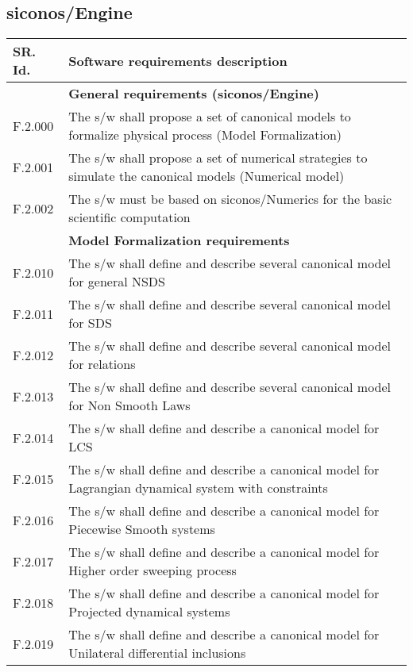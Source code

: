 

\subsection{\ac{siconos}/Engine}
\begin{longtable}{%
    |>{\columncolor[gray]{.8}}p{}%
    |>{\columncolor[gray]{.95}}p{}|}
  \hline
  \rowcolor[gray]{.8}   SR. Id. & Software requirements description \\
  \hline 
  \hline
  & \textbf{ General requirements (\ac{siconos}/Engine)}\\
  \hline
  F.2.000 & The s/w shall propose a set of  canonical models to formalize physical process  (Model Formalization) \\
  F.2.001 & The s/w shall propose a set of numerical strategies to simulate the  canonical models (Numerical model)\\
  F.2.002 & The s/w  must be based on \ac{siconos}/Numerics  for the basic  scientific computation \\
  \hline
  & \textbf{Model Formalization requirements }\\
  \hline
  F.2.010  &  The s/w shall  define and describe several canonical model for general NSDS \\
  F.2.011  &  The s/w shall  define and describe several canonical model for SDS\\
  F.2.012  &  The s/w shall  define and describe several canonical model for relations\\
  F.2.013  &  The s/w shall  define and describe several canonical model for Non Smooth Laws\\  
  F.2.014  &  The s/w shall  define and describe a canonical model for LCS  \\
  F.2.015  &  The s/w shall  define and describe a canonical model for Lagrangian dynamical system with constraints \\
  F.2.016  &  The s/w shall  define and describe a canonical model for Piecewise Smooth systems \\ 
  F.2.017  &  The s/w shall  define and describe a canonical model for Higher order sweeping process\\ 
  F.2.018  &  The s/w shall  define and describe a canonical model for Projected dynamical systems \\ 
  F.2.019  &  The s/w shall  define and describe a canonical model for Unilateral differential inclusions \\

\end{longtable}
